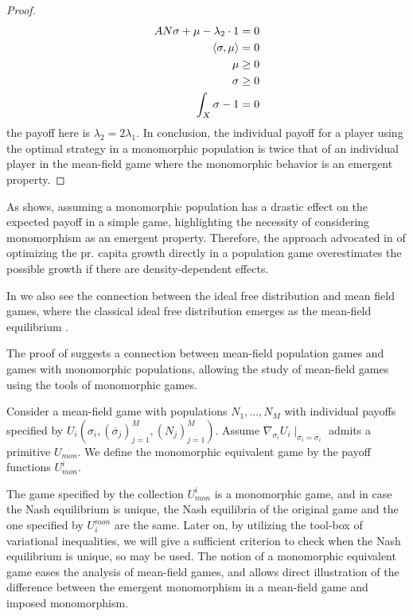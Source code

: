 \begin{proof}
\begin{equation}
  \begin{split}
    AN\sigma + \mu - \lambda_2 \cdot 1 = 0 \\
    \left \langle \sigma,\mu \right \rangle = 0 \\
    \mu \geq 0 \\
    \sigma \geq 0 \\
    \int_X \sigma - 1 = 0
  \end{split}
\end{equation}
the payoff here is $\lambda_2 = 2\lambda_1$. In conclusion, the individual payoff for a player using the optimal strategy in a monomorphic population is twice that of an individual player in the mean-field game where the monomorphic behavior is an emergent property.
\end{proof}
As  shows, assuming a monomorphic population has a drastic effect on the expected payoff in a simple game, highlighting the necessity of considering monomorphism as an emergent property. Therefore, the approach advocated in \citep{vincent2005evolutionary} of optimizing the pr. capita growth directly in a population game overestimates the possible growth if there are density-dependent effects.


In  we also see the connection between the ideal free distribution and mean field games, where the classical ideal free distribution emerges as the mean-field equilibrium .

The proof of  suggests a connection between mean-field population games and games with monomorphic populations, allowing the study of mean-field games using the tools of monomorphic games.
\begin{definition}
  \label{def:correspondence}
  Consider a mean-field game with populations $N_1,\dots,N_M$ with individual payoffs specified by $U_i(\sigma_i, (\overbar{\sigma}_j)_{j=1}^M, (N_j)_{j=1}^M)$. Assume $\nabla_{\sigma_i}U_i\mid_{\sigma_i=\overbar{\sigma}_i}$ admits a primitive $U_{mon}$. We define the monomorphic equivalent game by the payoff functions $U^i_{mon}$.
\end{definition}
The game specified by the collection $U^i_{mon}$ is a monomorphic game, and in case the Nash equilibrium is unique, the Nash equilibria of the original game and the one specified by $U_i^{mon}$ are the same. Later on, by utilizing the tool-box of variational inequalities, we will give a sufficient criterion to check when the Nash equilibrium is unique, so  may be used. The notion of a monomorphic equivalent game eases the analysis of mean-field games, and allows direct illustration of the difference between the emergent monomorphism in a mean-field game and imposed monomorphism.

